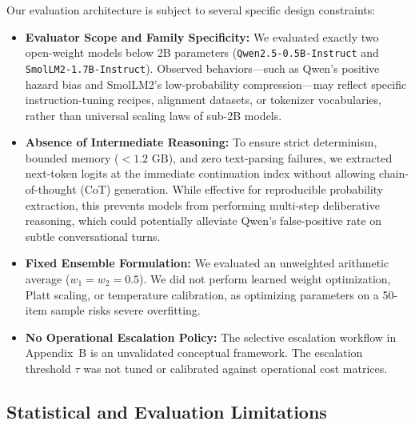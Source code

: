 Our evaluation architecture is subject to several specific design constraints:
\begin{itemize}
    \item \textbf{Evaluator Scope and Family Specificity:} We evaluated exactly two open-weight models below 2B parameters (\texttt{Qwen2.5-0.5B-Instruct} and \texttt{SmolLM2-1.7B-Instruct}). Observed behaviors—such as Qwen's positive hazard bias and SmolLM2's low-probability compression—may reflect specific instruction-tuning recipes, alignment datasets, or tokenizer vocabularies, rather than universal scaling laws of sub-2B models.
    \item \textbf{Absence of Intermediate Reasoning:} To ensure strict determinism, bounded memory ($<1.2\text{ GB}$), and zero text-parsing failures, we extracted next-token logits at the immediate continuation index without allowing chain-of-thought (CoT) generation. While effective for reproducible probability extraction, this prevents models from performing multi-step deliberative reasoning, which could potentially alleviate Qwen's false-positive rate on subtle conversational turns.
    \item \textbf{Fixed Ensemble Formulation:} We evaluated an unweighted arithmetic average ($w_1 = w_2 = 0.5$). We did not perform learned weight optimization, Platt scaling, or temperature calibration, as optimizing parameters on a 50-item sample risks severe overfitting.
    \item \textbf{No Operational Escalation Policy:} The selective escalation workflow in Appendix~B is an unvalidated conceptual framework. The escalation threshold $\tau$ was not tuned or calibrated against operational cost matrices.
\end{itemize}

\subsection{Statistical and Evaluation Limitations}
\label{subsec:lim_statistical}

